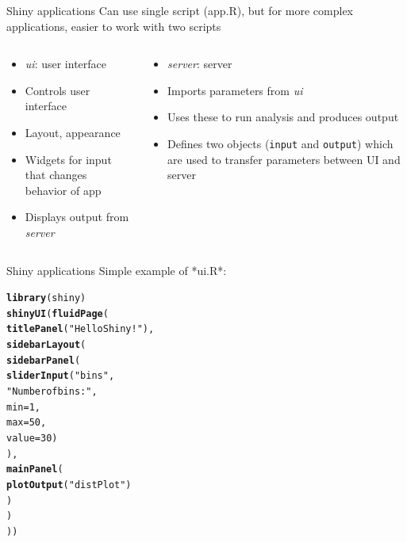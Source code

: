 \documentclass[aspectratio=169]{beamer}\usepackage[]{graphicx}\usepackage[]{color}
\makeatletter
\newcommand{\hlnum}[1]{\textcolor[rgb]{0.686,0.059,0.569}{#1}}%
\newcommand{\hlstr}[1]{\textcolor[rgb]{0.192,0.494,0.8}{#1}}%
\newcommand{\hlstd}[1]{\textcolor[rgb]{0.345,0.345,0.345}{#1}}%
\newcommand{\hlkwc}[1]{\textcolor[rgb]{0.333,0.667,0.333}{#1}}%
\newcommand{\hlkwd}[1]{\textcolor[rgb]{0.737,0.353,0.396}{\textbf{#1}}}%
\newenvironment{kframe}{%
 \def\at@end@of@kframe{}%
 \ifinner\ifhmode%
  \def\at@end@of@kframe{\end{minipage}}%
  \begin{minipage}{\columnwidth}%
 \fi\fi%
 \def\FrameCommand##1{\hskip\@totalleftmargin \hskip-\fboxsep
 \colorbox{shadecolor}{##1}\hskip-\fboxsep
     \hskip-\linewidth \hskip-\@totalleftmargin \hskip\columnwidth}%
 \MakeFramed {\advance\hsize-\width
   \@totalleftmargin\z@ \linewidth\hsize
   \@setminipage}}%
 {\par\unskip\endMakeFramed%
 \at@end@of@kframe}
\newenvironment{knitrout}{}{} %
\makeatother
\begin{document}
\begin{frame}[fragile]{Shiny applications}
Can use single script (app.R), but for more complex applications, easier to work with two scripts
\begin{columns}
	\begin{column}{0.5\textwidth}
    \begin{itemize}
      \item \emph{ui}: user interface
    	\item Controls user interface
    	\item Layout, appearance
    	\item Widgets for input that changes behavior of app
    	\item Displays output from \emph{server}
    \end{itemize}
	\end{column}
	\begin{column}{0.5\textwidth}
  \begin{itemize}
      \item \emph{server}: server
    	\item Imports parameters from \emph{ui}
    	\item Uses these to run analysis and produces output
    	\item Defines two objects (\texttt{input} and \texttt{output}) which are used to transfer parameters between UI and server
  \end{itemize}
	\end{column}
\end{columns}
\end{frame}

\begin{frame}[fragile]{Shiny applications}
Simple example of *ui.R*:
\begin{knitrout}\scriptsize
{}\color{fgcolor}\begin{kframe}
\begin{alltt}
\hlkwd{library}\hlstd{(shiny)}
\hlkwd{shinyUI}\hlstd{(}\hlkwd{fluidPage}\hlstd{(}
  \hlkwd{titlePanel}\hlstd{(}\hlstr{"Hello Shiny!"}\hlstd{),}
  \hlkwd{sidebarLayout}\hlstd{(}
    \hlkwd{sidebarPanel}\hlstd{(}
      \hlkwd{sliderInput}\hlstd{(}\hlstr{"bins"}\hlstd{,}
                  \hlstr{"Number of bins:"}\hlstd{,}
                  \hlkwc{min} \hlstd{=} \hlnum{1}\hlstd{,}
                  \hlkwc{max} \hlstd{=} \hlnum{50}\hlstd{,}
                  \hlkwc{value} \hlstd{=} \hlnum{30}\hlstd{)}
    \hlstd{),}
    \hlkwd{mainPanel}\hlstd{(}
      \hlkwd{plotOutput}\hlstd{(}\hlstr{"distPlot"}\hlstd{)}
    \hlstd{)}
  \hlstd{)}
\hlstd{))}
\end{alltt}
\end{kframe}
\end{knitrout}
\end{frame}
\end{document}
